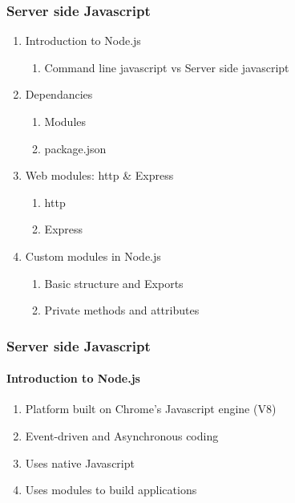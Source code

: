 \documentclass{beamer}
\begin{document}
	\begin{frame}
		\frametitle{Server side Javascript}
		\begin{enumerate}
			\item Introduction to Node.js
			\begin{enumerate}
				\item Command line javascript vs	%
					Server side javascript			%
			\end{enumerate}

			\item Dependancies						%
			\begin{enumerate}
				\item Modules						%
				\item package.json					%
			\end{enumerate}

			\item Web modules: http \& Express		%
			\begin{enumerate}
				\item http							%
				\item Express						%
			\end{enumerate}

			\item Custom modules in Node.js			%
			\begin{enumerate}
				\item Basic structure and Exports	%
				\item Private methods and attributes%
			\end{enumerate}
		\end{enumerate}
	\end{frame}

	\begin{frame}
		\frametitle{Server side Javascript}
		\framesubtitle{Introduction to Node.js}
		\begin{enumerate}
			\item Platform built on Chrome's Javascript engine (V8)
			\item Event-driven and Asynchronous coding
			\item Uses native Javascript
			\item Uses modules to build applications
		\end{enumerate}
	\end{frame}
\end{document}
